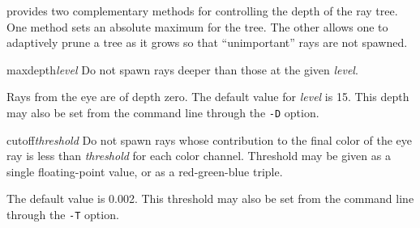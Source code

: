 {\Rayshade} provides two complementary methods for controlling the depth
of the ray tree.  One method sets an absolute maximum for the tree.  The
other allows one to adaptively prune a tree as it grows so that ``unimportant''
rays are not spawned.

\begin{defkey}{maxdepth}{{\em level}}
	Do not spawn rays deeper than those at the given {\em level}.
\end{defkey}
Rays from the eye are of depth zero.  The default value for
{\em level} is 15.
This depth may also be set from the command line through the {\tt -D} option.

\begin{defkey}{cutoff}{{\em threshold}}
	Do not spawn rays whose contribution to the final color of
	the eye ray is less than {\em threshold} for each color channel.
	Threshold may be given as a single floating-point value,
	or as a red-green-blue triple.
\end{defkey}
The default value is 0.002.  This threshold may also be set from
the command line through the {\tt -T} option.

